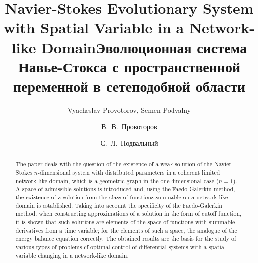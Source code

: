 \begin{englishtitle}
\title{Navier-Stokes Evolutionary System with Spatial Variable in a Network-like Domain}
\author{Vyacheslav Provotorov,
Semen Podvalny}

\maketitle

\begin{abstract}
The paper deals with the question of the existence of a weak solution of the Navier-Stokes $n$-dimensional system with distributed parameters in a coherent limited network-like domain, which is a geometric graph in the one-dimensional case ($n = 1 $). A space of admissible solutions is introduced and, using the Faedo-Galerkin method, the existence of a solution from the class of functions summable on a network-like domain is established.
Taking into account the specificity of the Faedo-Galerkin method, when constructing approximations of a solution in the form of cutoff function, it is shown that such solutions are elements of the space of functions with summable derivatives from a time variable; for the elements of such a space, the analogue of the energy balance equation correctly.
The obtained results are the basis for the study of various types of problems of optimal control of differential systems with a spatial variable changing in a network-like domain.



\end{abstract}
\end{englishtitle}

\iffalse
\documentclass[12pt]{llncs}
\usepackage[T2A]{fontenc}
\usepackage[utf8]{inputenc}
\usepackage[english,russian]{babel}
\usepackage[russian]{nla}




\fi

\title{Эволюционная система Навье-Стокса с пространственной переменной в сетеподобной области}
\author{В.~В.~Провоторов
  \and
  С.~Л.~Подвальный
} %

